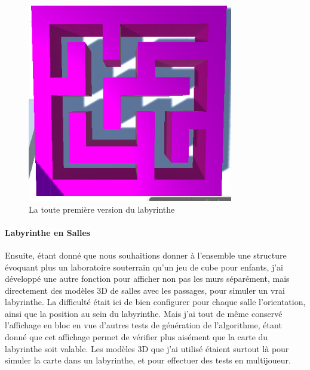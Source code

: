 \documentclass{article}
\begin{document}
\begin{figure}[H]
    \centering
    \includegraphics[width=0.8\textwidth]{Blocs.png}
    \caption{La toute première version du labyrinthe}
    \label{La toute première version du labyrinthe}
\end{figure}

\paragraph{Labyrinthe en Salles}
Ensuite, étant donné que nous souhaitions donner à l'ensemble une structure évoquant plus un laboratoire souterrain qu'un jeu de cube pour enfants, j'ai développé une autre fonction pour afficher non pas les murs séparément, mais directement des modèles 3D de salles avec les passages, pour simuler un vrai labyrinthe. La difficulté était ici de bien configurer pour chaque salle l'orientation, ainsi que la position au sein du labyrinthe. Mais j'ai tout de même conservé l'affichage en bloc en vue d'autres tests de génération de l'algorithme, étant donné que cet affichage permet de vérifier plus aisément que la carte du labyrinthe soit valable. Les modèles 3D que j'ai utilisé étaient surtout là pour simuler la carte dans un labyrinthe, et pour effectuer des tests en multijoueur.
\end{document}
